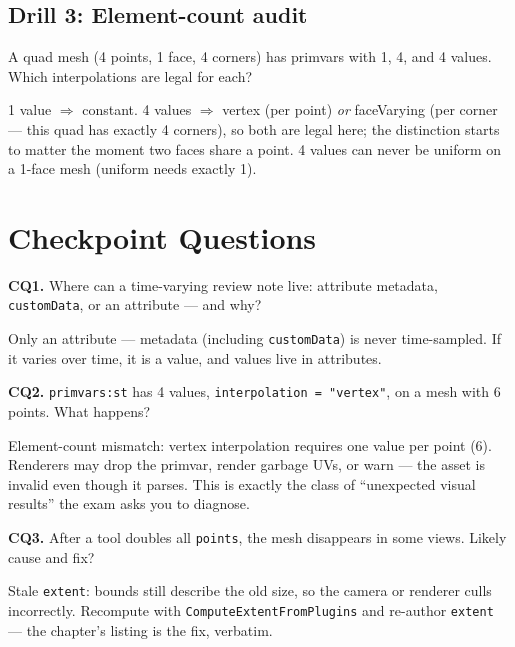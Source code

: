 \subsection*{Drill 3: Element-count audit}
A quad mesh (4 points, 1 face, 4 corners) has primvars with 1, 4, and 4
values. Which interpolations are legal for each?
\begin{DrillSolution}
1 value $\Rightarrow$ constant. 4 values $\Rightarrow$ vertex (per point)
\emph{or} faceVarying (per corner --- this quad has exactly 4 corners), so
both are legal here; the distinction starts to matter the moment two faces
share a point. 4 values can never be uniform on a 1-face mesh (uniform needs
exactly 1).
\end{DrillSolution}

\section*{Checkpoint Questions}

\noindent\textbf{CQ1.} Where can a time-varying review note live: attribute
metadata, \texttt{customData}, or an attribute --- and why?
\begin{DrillSolution}
Only an attribute --- metadata (including \texttt{customData}) is never
time-sampled. If it varies over time, it is a value, and values live in
attributes.
\end{DrillSolution}

\noindent\textbf{CQ2.} \texttt{primvars:st} has 4 values,
\texttt{interpolation = "vertex"}, on a mesh with 6 points. What happens?
\begin{DrillSolution}
Element-count mismatch: vertex interpolation requires one value per point
(6). Renderers may drop the primvar, render garbage UVs, or warn --- the
asset is invalid even though it parses. This is exactly the class of
``unexpected visual results'' the exam asks you to diagnose.
\end{DrillSolution}

\noindent\textbf{CQ3.} After a tool doubles all \texttt{points}, the mesh
disappears in some views. Likely cause and fix?
\begin{DrillSolution}
Stale \texttt{extent}: bounds still describe the old size, so the camera or
renderer culls incorrectly. Recompute with
\texttt{ComputeExtentFromPlugins} and re-author \texttt{extent} --- the
chapter's listing is the fix, verbatim.
\end{DrillSolution}

